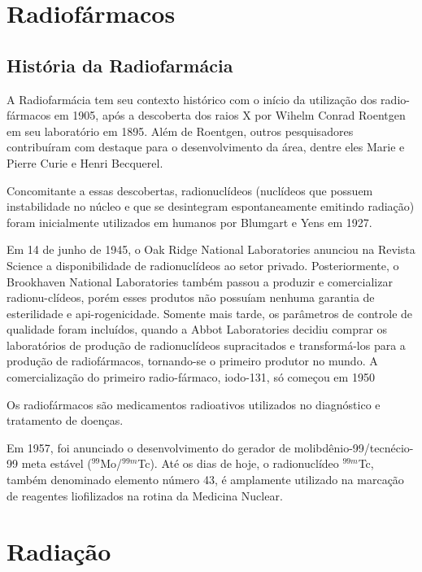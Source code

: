\documentclass[11pt]{article}
\author{Fabio Lima}
\date{\today}
\title{}
\begin{document}
\tableofcontents

\section{Radiofármacos}
\label{sec:orgb56c120}

\begin{multicols}{2}

\subsection{História da Radiofarmácia}
\label{sec:org5e64820}

A Radiofarmácia tem seu contexto histórico com o início da utilização dos radio-fármacos em 1905, após a descoberta dos raios X por Wihelm Conrad Roentgen em  seu  laboratório  em  1895.  Além  de  Roentgen,  outros  pesquisadores  contribuíram com destaque para o desenvolvimento da área, dentre eles Marie e Pierre Curie e Henri Becquerel.


Concomitante a essas descobertas, radionuclídeos (nuclídeos que possuem instabilidade no núcleo e que se desintegram espontaneamente emitindo radiação) foram inicialmente utilizados em humanos por Blumgart e Yens em 1927.


Em 14 de junho de 1945, o Oak Ridge National Laboratories anunciou na Revista Science a disponibilidade de radionuclídeos ao setor privado. Posteriormente, o Brookhaven National Laboratories também passou a produzir e comercializar radionu-clídeos, porém esses produtos não possuíam nenhuma garantia de esterilidade e api-rogenicidade. Somente mais tarde, os parâmetros de controle de qualidade foram incluídos, quando a Abbot Laboratories decidiu comprar os laboratórios de produção de radionuclídeos supracitados e transformá-los para a produção de radiofármacos, tornando-se o primeiro produtor no mundo. A comercialização do primeiro radio-fármaco, iodo-131, só começou em 1950


Os radiofármacos são medicamentos radioativos utilizados no diagnóstico e tratamento de doenças.

Em 1957, foi anunciado o desenvolvimento do gerador de molibdênio-99/tecnécio-99 meta estável (\(^{99}\)Mo/\(^{99m}\)Tc). Até os dias de hoje, o radionuclídeo \(^{99m}\)Tc, também denominado elemento número 43, é amplamente utilizado na marcação de reagentes liofilizados na rotina da Medicina Nuclear.

\section{Radiação}
\label{sec:org7d428ca}


\end{multicols}
\end{document}
